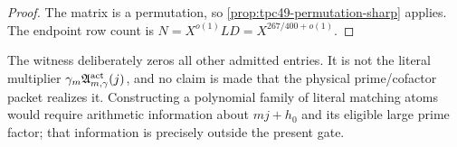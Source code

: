 \begin{proof}
The matrix is a permutation, so
\cref{prop:tpc49-permutation-sharp} applies.  The endpoint row count is
\(N=X^{o(1)}LD=X^{267/400+o(1)}\).
\end{proof}

The witness deliberately zeros all other admitted entries.  It is not
the literal multiplier \(\gamma_m\mathfrak A_{m,\gamma}^{\rm act}(j)\),
and no claim is made that the physical prime/cofactor packet realizes
it.  Constructing a polynomial family of literal matching atoms would
require arithmetic information about \(mj+h_0\) and its eligible large
prime factor; that information is precisely outside the present gate.
